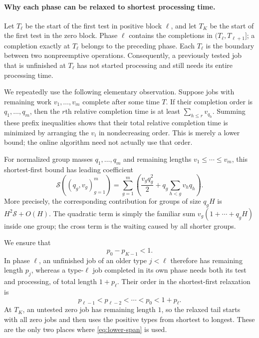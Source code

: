 \paragraph{Why each phase can be relaxed to shortest processing time.}
Let $T_\ell$ be the start of the first test in positive block $\ell$, and let
$T_K$ be the start of the first test in the zero block.  Phase $\ell$ contains
the completions in $(T_\ell,T_{\ell+1}]$; a completion exactly at $T_\ell$
belongs to the preceding phase.  Each $T_\ell$ is the boundary between two
nonpreemptive operations.  Consequently, a previously tested job that is
unfinished at $T_\ell$ has not started processing and still needs its entire
processing time.

We repeatedly use the following elementary observation.  Suppose jobs with
remaining work $v_1,\ldots,v_m$ complete after some time $T$.  If their
completion order is $q_1,\ldots,q_m$, then the $r$th relative completion time
is at least $\sum_{h\le r}v_{q_h}$.  Summing these prefix inequalities shows
that their total relative completion time is minimized by arranging the
$v_i$ in nondecreasing order.  This is merely a lower bound; the online
algorithm need not actually use that order.

For normalized group masses $q_1,\ldots,q_m$ and remaining lengths
$v_1\le\cdots\le v_m$, this shortest-first bound has leading coefficient
\begin{equation}
 \mathcal S((q_g,v_g)_{g=1}^m)
 =\sum_{g=1}^m
   \left(\frac{v_gq_g^2}{2}
    +q_g\sum_{h<g}v_hq_h\right).
 \label{eq:lower-S}
\end{equation}
More precisely, the corresponding contribution for groups of size $q_gH$
is $H^2\mathcal S+O(H)$.  The quadratic term is simply the familiar sum
$v_g(1+\cdots+q_gH)$ inside one group; the cross term is the waiting caused
by all shorter groups.

We ensure that
\begin{equation}
  p_0-p_{K-1}<1.
  \label{eq:lower-span}
\end{equation}
In phase $\ell$, an unfinished job of an older type $j<\ell$ therefore has
remaining length $p_j$, whereas a type-$\ell$ job completed in its own phase
needs both its test and processing, of total length $1+p_\ell$.  Their order
in the shortest-first relaxation is
\[
  p_{\ell-1}<p_{\ell-2}<\cdots<p_0<1+p_\ell.
\]
At $T_K$, an untested zero job has remaining length $1$, so the relaxed tail
starts with all zero jobs and then uses the positive types from shortest to
longest.  These are the only two places where
\cref{eq:lower-span} is used.

